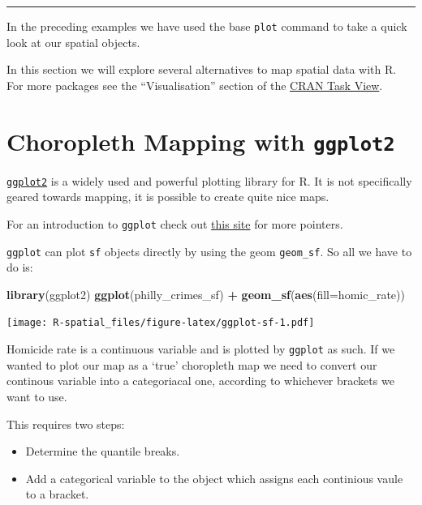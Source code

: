 \documentclass[
]{book}
\newenvironment{Shaded}{\begin{snugshade}}{\end{snugshade}}
\newcommand{\AttributeTok}[1]{\textcolor[rgb]{0.13,0.29,0.53}{#1}}
\newcommand{\FunctionTok}[1]{\textcolor[rgb]{0.13,0.29,0.53}{\textbf{#1}}}
\newcommand{\NormalTok}[1]{#1}
\newcommand{\SpecialCharTok}[1]{\textcolor[rgb]{0.81,0.36,0.00}{\textbf{#1}}}
\providecommand{\tightlist}{%
  \setlength{\itemsep}{0pt}\setlength{\parskip}{0pt}}
\begin{document}
\begin{center}\rule{0.5\linewidth}{0.5pt}\end{center}

In the preceding examples we have used the base \texttt{plot} command to take a quick look at our spatial objects.

In this section we will explore several alternatives to map spatial data with R. For more packages see the ``Visualisation'' section of the \href{https://cran.r-project.org/web/views/Spatial.html}{CRAN Task View}.

\hypertarget{choropleth-mapping-with-ggplot2}{%
\section{\texorpdfstring{Choropleth Mapping with \texttt{ggplot2}}{Choropleth Mapping with ggplot2}}\label{choropleth-mapping-with-ggplot2}}

\href{http://ggplot2.org/}{\texttt{ggplot2}} is a widely used and powerful plotting library for R. It is not specifically geared towards mapping, it is possible to create quite nice maps.

For an introduction to \texttt{ggplot} check out \href{http://ggplot2.tidyverse.org/}{this site} for more pointers.

\texttt{ggplot} can plot \texttt{sf} objects directly by using the geom \texttt{geom\_sf}. So all we have to do is:

\begin{Shaded}
\begin{Highlighting}[]
\FunctionTok{library}\NormalTok{(ggplot2)}
\FunctionTok{ggplot}\NormalTok{(philly\_crimes\_sf) }\SpecialCharTok{+} 
  \FunctionTok{geom\_sf}\NormalTok{(}\FunctionTok{aes}\NormalTok{(}\AttributeTok{fill=}\NormalTok{homic\_rate))}
\end{Highlighting}
\end{Shaded}

\texttt{[image: R-spatial\_files/figure-latex/ggplot-sf-1.pdf]}

Homicide rate is a continuous variable and is plotted by \texttt{ggplot} as such. If we wanted to plot our map as a `true' choropleth map we need to convert our continous variable into a categoriacal one, according to whichever brackets we want to use.

This requires two steps:

\begin{itemize}
\tightlist
\item
  Determine the quantile breaks.
\item
  Add a categorical variable to the object which assigns each continious vaule to a bracket.
\end{itemize}
\end{document}
